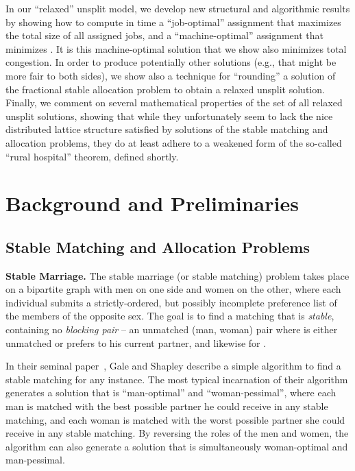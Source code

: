 \documentclass{llncs}
\begin{document}
In our ``relaxed'' unsplit model, we develop new structural and
algorithmic results by showing how to compute in  time a
``job-optimal'' assignment that maximizes the total size  of all
assigned jobs, and a ``machine-optimal'' assignment that minimizes
.  It is this machine-optimal solution that we show also
minimizes total congestion.  In order to produce potentially other
solutions (e.g., that might be more fair to both sides), we show also
a technique for ``rounding'' a solution of the fractional stable
allocation problem to obtain a relaxed unsplit solution.  Finally, we
comment on several mathematical properties of the set of all relaxed
unsplit solutions, showing that while they unfortunately seem to lack
the nice distributed lattice structure satisfied by solutions of the
stable matching and allocation problems, they do at least adhere to a
weakened form of the so-called ``rural hospital'' theorem, defined
shortly.

\iffalse

We review preliminary concepts and background material in the next
section, then introduce our structural and algorithmic results for
computing relaxed unsplit solutions maximizing or minimizing ,
showing how these can be used to solve the unsplittable stable
allocation problem in linear time.  Finally, we discuss our rounding
method for producing additional relaxed unsplit assignments.

\fi

\section{Background and Preliminaries}

\subsection{Stable Matching and Allocation Problems}

{\bf Stable Marriage.} The stable marriage (or stable matching)
problem takes place on a bipartite graph with men on one side and
women on the other, where each individual submits a strictly-ordered,
but possibly incomplete preference list of the members of the opposite
sex.  The goal is to find a matching that is \emph{stable}, containing
no \emph{blocking pair} -- an unmatched (man, woman) pair 
where  is either unmatched or prefers  to his current partner,
and likewise for .  

In their seminal paper~\cite{GS:1962}, Gale and Shapley describe a
simple  algorithm to find a stable matching for any instance.
The most typical incarnation of their algorithm generates a solution
that is ``man-optimal'' and ``woman-pessimal'', where each man is
matched with the best possible partner he could receive in any stable
matching, and each woman is matched with the worst possible partner
she could receive in any stable matching.  By reversing the roles of
the men and women, the algorithm can also generate a solution that is
simultaneously woman-optimal and man-pessimal.
\end{document}
